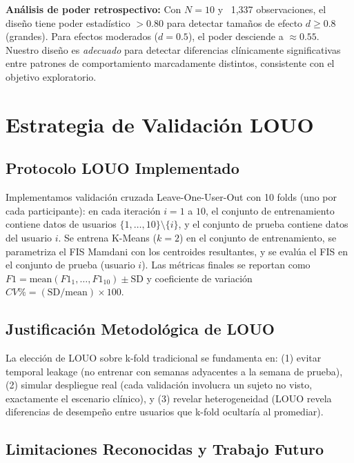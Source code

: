 \textbf{Análisis de poder retrospectivo:} Con $N=10$ y ~1,337 observaciones, el diseño tiene poder estadístico $> 0.80$ para detectar tamaños de efecto $d \geq 0.8$ (grandes). Para efectos moderados ($d=0.5$), el poder desciende a $\approx 0.55$. Nuestro diseño es \textit{adecuado} para detectar diferencias clínicamente significativas entre patrones de comportamiento marcadamente distintos, consistente con el objetivo exploratorio.

\section{Estrategia de Validación LOUO}
\label{sec:estrategia_louo}

\subsection{Protocolo LOUO Implementado}
\label{subsec:protocolo_louo}

Implementamos validación cruzada Leave-One-User-Out con 10 folds (uno por cada participante): en cada iteración $i=1$ a $10$, el conjunto de entrenamiento contiene datos de usuarios $\{1,\ldots,10\} \setminus \{i\}$, y el conjunto de prueba contiene datos del usuario $i$. Se entrena K-Means ($k=2$) en el conjunto de entrenamiento, se parametriza el FIS Mamdani con los centroides resultantes, y se evalúa el FIS en el conjunto de prueba (usuario $i$). Las métricas finales se reportan como $F1 = \text{mean}(F1_1, \ldots, F1_{10}) \pm \text{SD}$ y coeficiente de variación $CV\% = (\text{SD}/\text{mean}) \times 100$.

\subsection{Justificación Metodológica de LOUO}
\label{subsec:justificacion_louo}

La elección de LOUO sobre k-fold tradicional se fundamenta en: (1) evitar temporal leakage (no entrenar con semanas adyacentes a la semana de prueba), (2) simular despliegue real (cada validación involucra un sujeto no visto, exactamente el escenario clínico), y (3) revelar heterogeneidad (LOUO revela diferencias de desempeño entre usuarios que k-fold ocultaría al promediar).

\subsection{Limitaciones Reconocidas y Trabajo Futuro}
\label{subsec:limitaciones_trabajo_futuro}

